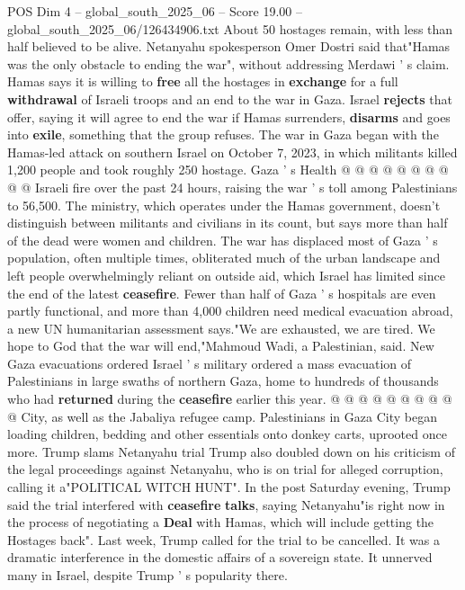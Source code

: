 \begin{textsample}{POS Dim 4 – global\_south\_2025\_06 – Score 19.00 – global\_south\_2025\_06/126434906.txt}
About 50 hostages remain, with less than half believed to be alive.
Netanyahu spokesperson Omer Dostri said that"Hamas was the only obstacle to ending the war", without addressing Merdawi ' s claim.
Hamas says it is willing to \textbf{free} all the hostages in \textbf{exchange} for a full \textbf{withdrawal} of Israeli troops and an end to the war in Gaza.
Israel \textbf{rejects} that offer, saying it will agree to end the war if Hamas surrenders, \textbf{disarms} and goes into \textbf{exile}, something that the group refuses.
The war in Gaza began with the Hamas-led attack on southern Israel on October 7, 2023, in which militants killed 1,200 people and took roughly 250 hostage.
Gaza ' s Health @ @ @ @ @ @ @ @ @ @ Israeli fire over the past 24 hours, raising the war ' s toll among Palestinians to 56,500.
The ministry, which operates under the Hamas government, doesn't distinguish between militants and civilians in its count, but says more than half of the dead were women and children.
The war has displaced most of Gaza ' s population, often multiple times, obliterated much of the urban landscape and left people overwhelmingly reliant on outside aid, which Israel has limited since the end of the latest \textbf{ceasefire}.
Fewer than half of Gaza ' s hospitals are even partly functional, and more than 4,000 children need medical evacuation abroad, a new UN humanitarian assessment says."We are exhausted, we are tired.
We hope to God that the war will end,"Mahmoud Wadi, a Palestinian, said.
New Gaza evacuations ordered Israel ' s military ordered a mass evacuation of Palestinians in large swaths of northern Gaza, home to hundreds of thousands who had \textbf{returned} during the \textbf{ceasefire} earlier this year. @ @ @ @ @ @ @ @ @ @ City, as well as the Jabaliya refugee camp.
Palestinians in Gaza City began loading children, bedding and other essentials onto donkey carts, uprooted once more.
Trump slams Netanyahu trial Trump also doubled down on his criticism of the legal proceedings against Netanyahu, who is on trial for alleged corruption, calling it a"POLITICAL WITCH HUNT".
In the post Saturday evening, Trump said the trial interfered with \textbf{ceasefire} \textbf{talks}, saying Netanyahu"is right now in the process of negotiating a \textbf{Deal} with Hamas, which will include getting the Hostages back".
Last week, Trump called for the trial to be cancelled.
It was a dramatic interference in the domestic affairs of a sovereign state.
It unnerved many in Israel, despite Trump ' s popularity there.

\end{textsample}
